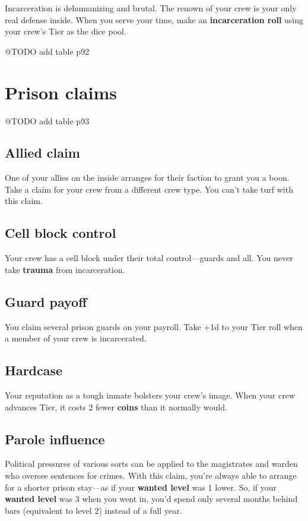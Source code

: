 \documentclass[11pt,fleqn,a5paper]{book}
\newcommand{\gameterm}[1]{\textbf{#1}}
\begin{document}
Incarceration is dehumanizing and brutal. The renown of your crew is your only real defense inside. When you serve your time, make an \textbf{incarceration roll} using your crew’s Tier as the dice pool.

@TODO add table p92

\section{Prison claims}

@TODO add table p93

\subsection{Allied claim}

One of your allies on the inside arranges for their faction to grant you a boon. Take a claim for your crew from a different crew type. You can’t take turf with this claim.

\subsection{Cell block control}

Your crew has a cell block under their total control---guards and all. You never take \gameterm{trauma}  from incarceration.

\subsection{Guard payoff}

You claim several prison guards on your payroll. Take +1d to your Tier roll when a member of your crew is incarcerated.

\subsection{Hardcase}

Your reputation as a tough inmate bolsters your crew’s image. When your crew advances Tier, it costs 2 fewer \gameterm{coins}  than it normally would.

\subsection{Parole influence}

Political pressures of various sorts can be applied to the magistrates and warden who oversee sentences for crimes. With this claim, you’re always able to arrange for a shorter prison stay---as if your \gameterm{wanted level}  was 1 lower. So, if your \gameterm{wanted level}  was 3 when you went in, you’d spend only several months behind bars (equivalent to level 2) instead of a full year.
\end{document}
